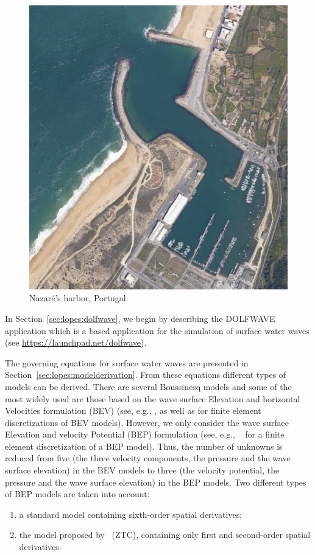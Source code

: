 \begin{figure}
  \centering
  \includegraphics[width=\smallfig]{chapters/lopes/pdf/nazare1.pdf}
  \caption{Nazar\'{e}'s harbor, Portugal.}
  \label{fig:lopes:harbor}
\end{figure}

In Section~\ref{sec:lopes:dolfwave}, we begin by describing the
DOLFWAVE application which is a \fenics based application for the
simulation of surface water waves (see
\url{https://launchpad.net/dolfwave}).

The governing equations for surface water waves are presented in
Section~\ref{sec:lopes:modelderivation}. From these equations
different types of models can be derived. There are several Boussinesq
models and some of the most widely used are those based on the wave
surface Elevation and horizontal Velocities formulation (BEV) (see,
e.g., \citet{WalkleyBerzins2002}, \citet{WooLiu2004a} as well as
\citet{WooLiu2004b} for finite element discretizations of BEV models).
However, we only consider the wave surface Elevation and velocity
Potential (BEP) formulation (see, e.g.,
~\citet{LangtangenPedersen1998} for a finite element discretization of
a BEP model).  Thus, the number of unknowns is reduced from five (the
three velocity components, the pressure and the wave surface
elevation) in the BEV models to three (the velocity potential, the
pressure and the wave surface elevation) in the BEP models. Two
different types of BEP models are taken into account:
\begin{enumerate}
\item \label{lopes:i}  a standard  model containing sixth-order
  spatial derivatives;
\item the  model proposed by~\citet{ZhaoTengCheng2004} (ZTC),
 containing only first and second-order spatial derivatives.
\end{enumerate}

